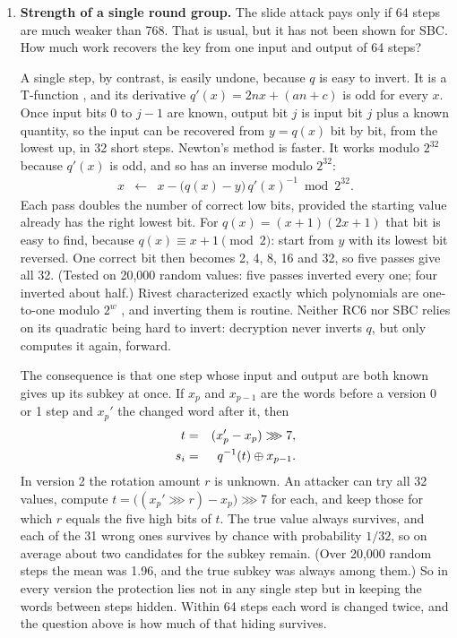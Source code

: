 \begin{enumerate}
\item \textbf{Strength of a single round group.} The slide attack pays only
      if 64 steps are much weaker than 768. That is usual, but it has not been
      shown for SBC. How much work recovers the key from one input and output
      of 64 steps?

      A single step, by contrast, is easily undone, because $q$ is easy to
      invert. It is a T-function \cite{klimov2002}, and its derivative
      $q'(x) = 2nx + (an + c)$ is odd for every $x$. Once input bits 0 to
      $j-1$ are known, output bit $j$ is input bit $j$ plus a known quantity,
      so the input can be recovered from $y = q(x)$ bit by bit, from the
      lowest up, in 32 short steps. Newton's method is faster. It works modulo
      $2^{32}$ because $q'(x)$ is odd, and so has an inverse modulo $2^{32}$:
      \begin{eqnarray}
      x &\leftarrow& x - \bigl( q(x) - y \bigr)\, q'(x)^{-1} \bmod 2^{32}.
      \label{eq:qinv_A}
      \end{eqnarray}
      Each pass doubles the number of correct low bits, provided the starting
      value already has the right lowest bit. For $q(x) = (x+1)(2x+1)$ that
      bit is easy to find, because $q(x) \equiv x + 1 \pmod 2$: start from $y$
      with its lowest bit reversed. One correct bit then becomes 2, 4, 8, 16
      and 32, so five passes give all 32. (Tested on 20,000 random values:
      five passes inverted every one; four inverted about half.) Rivest characterized exactly which polynomials are one-to-one
      modulo $2^w$ \cite{rivest2001}, and inverting them is routine. Neither
      RC6 nor SBC relies on its quadratic being hard to invert: decryption
      never inverts $q$, but only computes it again, forward.

      The consequence is that one step whose input and output are both known
      gives up its subkey at once. If $x_p$ and $x_{p-1}$ are the words before
      a version 0 or 1 step and $x_p'$ the changed word after it, then
      \begin{eqnarray}
      t &=& (x_p' - x_p) \ggg 7, \label{eq:qinv_B} \\
      s_i &=& q^{-1}(t) \oplus x_{p-1}. \label{eq:qinv_C}
      \end{eqnarray}
      In version 2 the rotation amount $r$ is unknown. An attacker can try
      all 32 values, compute $t = \bigl( (x_p' \ggg r) - x_p \bigr) \ggg 7$
      for each, and keep those for which $r$ equals the five high bits of $t$.
      The true value always survives, and each of the 31 wrong ones survives
      by chance with probability $1/32$, so on average about two candidates
      for the subkey remain. (Over 20,000 random steps the mean was 1.96, and
      the true subkey was always among them.) So in every version the
      protection lies not
      in any single step but in keeping the words between steps hidden.
      Within 64 steps each word is changed twice, and the question above is
      how much of that hiding survives.


\end{enumerate}
